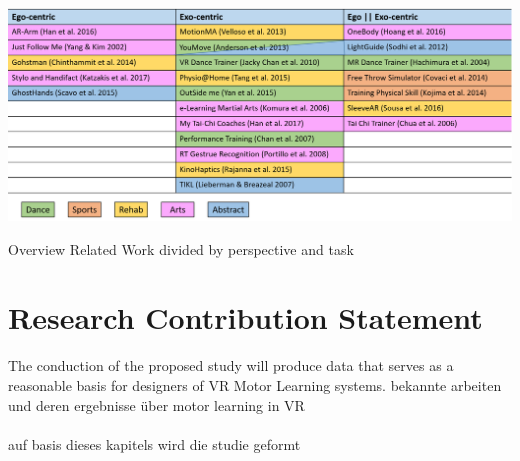 \begin{table}[htb]
	\centering
	\includegraphics[width=\textwidth]{figures/rw_overview.png}
	\caption[Overview seminar evaluation]{Overview Related Work divided by perspective and task}
	\label{tab:rw_overview}
\end{table}
\section{Research Contribution Statement}
\label{delimination_contribution}
The conduction of the proposed study will produce data that serves as a reasonable basis for designers of VR Motor Learning systems.
bekannte arbeiten und deren ergebnisse über motor learning in VR\\
\\
auf basis dieses kapitels wird die studie geformt

